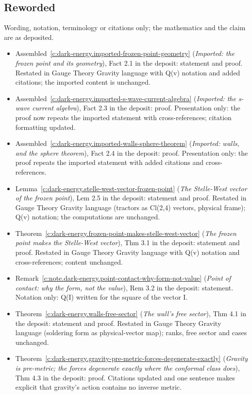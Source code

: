 \documentclass[11pt]{article}
\theoremstyle{definition}
\theoremstyle{plain}
\begin{document}
\subsection*{Reworded}
Wording, notation, terminology or citations only; the mathematics and the claim are as deposited.
\begin{itemize}\setlength{\itemsep}{2pt}
\item Assembled~\ref{c:dark-energy.imported-frozen-point-geometry} (\emph{Imported: the frozen point and its geometry}), Fact 2.1 in the deposit: statement and proof. Restated in Gauge Theory Gravity language with Q(v) notation and added citations; the imported content is unchanged.
\item Assembled~\ref{c:dark-energy.imported-s-wave-current-algebra} (\emph{Imported: the s-wave current algebra}), Fact 2.3 in the deposit: proof. Presentation only: the proof now repeats the imported statement with cross-references; citation formatting updated.
\item Assembled~\ref{c:dark-energy.imported-walls-sphere-theorem} (\emph{Imported: walls, and the sphere theorem}), Fact 2.4 in the deposit: proof. Presentation only: the proof repeats the imported statement with added citations and cross-references.
\item Lemma~\ref{c:dark-energy.stelle-west-vector-frozen-point} (\emph{The Stelle-West vector of the frozen point}), Lem 2.5 in the deposit: statement and proof. Restated in Gauge Theory Gravity language (tractors as Cl(2,4) vectors, physical frame); Q(v) notation; the computations are unchanged.
\item Theorem~\ref{c:dark-energy.frozen-point-makes-stelle-west-vector} (\emph{The frozen point makes the Stelle-West vector}), Thm 3.1 in the deposit: statement and proof. Restated in Gauge Theory Gravity language with Q(v) notation and cross-references; content unchanged.
\item Remark~\ref{c:note.dark-energy.point-contact-why-form-not-value} (\emph{Point of contact: why the form, not the value}), Rem 3.2 in the deposit: statement. Notation only: Q(I) written for the square of the vector I.
\item Theorem~\ref{c:dark-energy.walls-free-sector} (\emph{The wall's free sector}), Thm 4.1 in the deposit: statement and proof. Restated in Gauge Theory Gravity language (soldering form as physical-vector map); ranks, free sector and cases unchanged.
\item Theorem~\ref{c:dark-energy.gravity-pre-metric-forces-degenerate-exactly} (\emph{Gravity is pre-metric; the forces degenerate exactly where the conformal class does}), Thm 4.3 in the deposit: proof. Citations updated and one sentence makes explicit that gravity's action contains no inverse metric.

\end{itemize}
\end{document}
